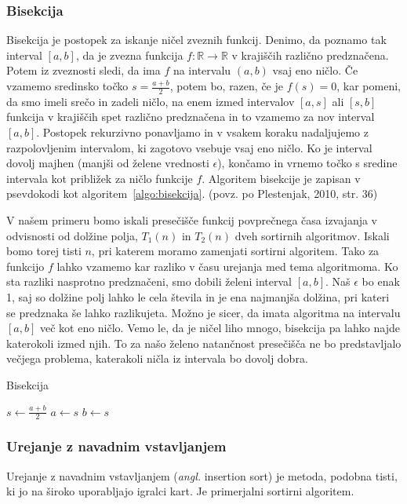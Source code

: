 \documentclass[a4paper,oneside,12pt]{article}
\def\R{\mathbb R}
\begin{document}
\subsubsection{Bisekcija}
Bisekcija je postopek za iskanje ničel zveznih funkcij. Denimo, da poznamo tak interval $[a, b]$,
da je zvezna funkcija $f\!\!: \R \rightarrow \R$ v krajiščih različno predznačena.
Potem iz zveznosti sledi, da ima $f$ na
intervalu $(a, b)$ vsaj eno ničlo. Če vzamemo sredinsko točko $s = \frac{a + b}{2}$, potem bo, razen,
če je $f(s) = 0$, kar pomeni, da smo imeli srečo in zadeli ničlo, na enem izmed intervalov $[a, s]$
ali $[s, b]$ funkcija v krajiščih spet različno predznačena in to vzamemo za nov interval $[a, b]$. 
Postopek rekurzivno ponavljamo in v vsakem koraku nadaljujemo z razpolovljenim intervalom,
ki zagotovo vsebuje vsaj eno ničlo. Ko je interval dovolj majhen (manjši od želene vrednosti $\epsilon$), končamo in vrnemo točko s
sredine intervala kot približek za ničlo funkcije $f$. Algoritem bisekcije je zapisan v psevdokodi kot 
algoritem~\ref{algo:bisekcija}.
(povz. po Plestenjak, 2010, str. 36) 

V našem primeru bomo iskali presečišče funkcij povprečnega časa izvajanja v odvisnosti od dolžine polja, $T_1(n)$ in 
$T_2(n)$ dveh sortirnih algoritmov. Iskali bomo torej tisti $n$, pri katerem moramo zamenjati sortirni algoritem. 
Tako za funkcijo $f$ lahko vzamemo kar razliko v času urejanja med tema algoritmoma.
Ko sta razliki nasprotno predznačeni,
smo dobili želeni interval $[a, b]$. Naš $\epsilon$ bo enak 1, saj so dolžine polj lahko le cela števila
in je ena najmanjša dolžina, pri kateri se predznaka še lahko razlikujeta.
Možno je sicer, da imata algoritma na intervalu $[a, b]$ več kot eno ničlo. 
Vemo le, da je ničel liho mnogo, bisekcija pa lahko najde katerokoli izmed njih.
To za našo želeno natančnost presečišča ne bo predstavljalo večjega problema, katerakoli 
ničla iz intervala bo dovolj dobra.

\begin{algorithm}[h!t!]
  \caption{Bisekcija}\label{algo:bisekcija}
  \begin{algorithmic}[1]
        \State $s \gets \frac{a+b}{2}$
          \State $a \gets s$
        \Else
          \State $b \gets s$
        \EndIf
    \EndWhile
  \end{algorithmic}
\end{algorithm}

\subsubsection{Urejanje z navadnim vstavljanjem}
\label{chapter:insertionsort}
Urejanje z navadnim vstavljanjem (\emph{angl.} insertion sort) je metoda,
podobna tisti, ki jo na široko uporabljajo igralci kart. Je primerjalni sortirni algoritem.
\end{document}
